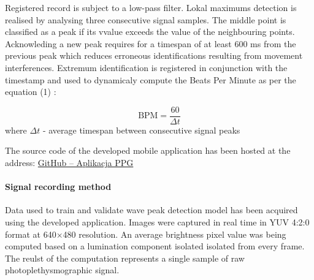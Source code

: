 \documentclass[journal]{IEEEtran}
\begin{document}
{Registered record is subject to a low-pass filter. Lokal maximums detection is realised by analysing three consecutive signal samples. The middle point is classified as a peak if its vvalue exceeds the value of the neighbouring points. Acknowleding a new peak requires for a timespan of at least 600 ms from the previous peak which reduces erroneous identifications resulting from movement interferences. Extremum identification is registered in conjunction with the timestamp and used to dynamicaly compute the Beats Per Minute as per the equation (1) :

\begin{equation}
\text{BPM} = \frac{60}{\Delta t}
\label{eq:bpm}
\end{equation}
where $\Delta t$  - average timespan between consecutive signal peaks

The source code of the developed mobile application has been hosted at the address:
\href{https://github.com/JanBancerewicz/PPGbetter}{GitHub – Aplikacja PPG}

\newpage
\paragraph{Signal recording method}
Data used to train and validate wave peak detection model has been acquired using the developed application. Images were captured in real time in YUV 4:2:0 format at 640×480 resolution. An average brightness pixel value was being computed based on a lumination component isolated isolated from every frame. The reulst of the computation represents a single sample of raw photoplethysmographic signal.

}
\end{document}
